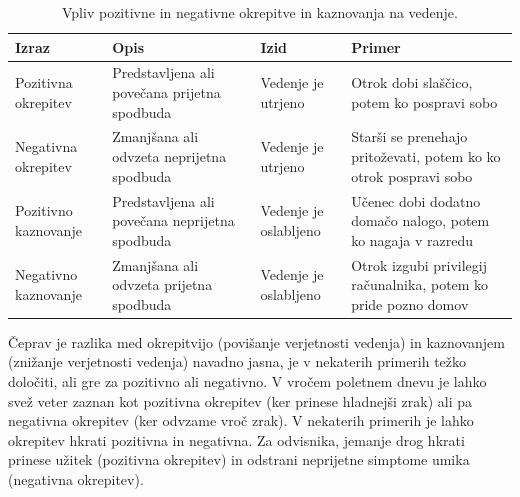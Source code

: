 \documentclass[a4paper, oneside, 12pt]{report}
\begin{document}
\begin{table}[htbp]
\begin{tabulary}{\textwidth}{| L | L | L | L |}
\hline
\textbf{Izraz} & \textbf{Opis} & \textbf{Izid} & \textbf{Primer} \\ \hline
Pozitivna okrepitev & Predstavljena ali povečana prijetna spodbuda & Vedenje je utrjeno & Otrok dobi slaščico, potem ko pospravi sobo \\ \hline
Negativna okrepitev & Zmanjšana ali odvzeta neprijetna spodbuda & Vedenje je utrjeno & Starši se prenehajo pritoževati, potem ko ko otrok pospravi sobo \\ \hline
Pozitivno kaznovanje & Predstavljena ali povečana neprijetna spodbuda & Vedenje je oslabljeno & Učenec dobi dodatno domačo nalogo, potem ko nagaja v razredu \\ \hline
Negativno kaznovanje & Zmanjšana ali odvzeta prijetna spodbuda & Vedenje je oslabljeno & Otrok izgubi privilegij računalnika, potem ko pride pozno domov \\ \hline
\end{tabulary}
\caption{Vpliv pozitivne in negativne okrepitve in kaznovanja na vedenje.}
\label{table:OperantConditioningTerms}
\end{table}

Čeprav je razlika med okrepitvijo (povišanje verjetnosti vedenja) in kaznovanjem (znižanje verjetnosti vedenja) navadno jasna, je v nekaterih primerih težko določiti, ali gre za pozitivno ali negativno. V vročem poletnem dnevu je lahko svež veter zaznan kot pozitivna okrepitev (ker prinese hladnejši zrak) ali pa negativna okrepitev (ker odvzame vroč zrak). V nekaterih primerih je lahko okrepitev hkrati pozitivna in negativna. Za odvisnika, jemanje drog hkrati prinese užitek (pozitivna okrepitev) in odstrani neprijetne simptome umika (negativna okrepitev).
\end{document}
